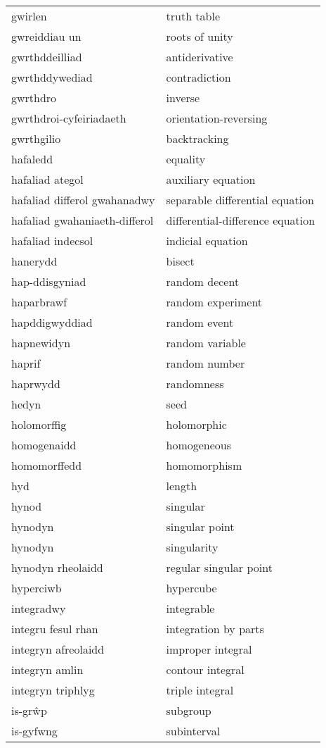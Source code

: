 \begin{supertabular}{p{0.22\textwidth}p{0.22\textwidth}}
gwirlen & truth table \\
gwreiddiau un & roots of unity \\
gwrthddeilliad & antiderivative \\
gwrthddywediad & contradiction \\
gwrthdro & inverse \\
gwrthdroi-cyfeiriadaeth & orientation-reversing \\
gwrthgilio & backtracking \\
hafaledd & equality \\
hafaliad ategol & auxiliary equation \\
hafaliad differol gwahanadwy & separable differential equation \\
hafaliad gwahaniaeth-differol & differential-difference equation \\
hafaliad indecsol & indicial equation \\
hanerydd & bisect \\
hap-ddisgyniad & random decent \\
haparbrawf & random experiment \\
hapddigwyddiad & random event \\
hapnewidyn & random variable \\
haprif & random number \\
haprwydd & randomness \\
hedyn & seed \\
holomorffig & holomorphic \\
homogenaidd & homogeneous \\
homomorffedd & homomorphism \\
hyd & length \\
hynod & singular \\
hynodyn & singular point \\
hynodyn & singularity \\
hynodyn rheolaidd & regular singular point \\
hyperciwb & hypercube \\
integradwy & integrable \\
integru fesul rhan & integration by parts \\
integryn afreolaidd & improper integral \\
integryn amlin & contour integral \\
integryn triphlyg & triple integral \\
is-grŵp & subgroup \\
is-gyfwng & subinterval \\

\end{supertabular}
